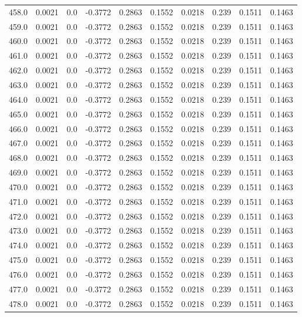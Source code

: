 \begin{longtable}{lrrrrrrrrr}
458.0 & 0.0021 & 0.0 & -0.3772 & 0.2863 & 0.1552 & 0.0218 & 0.239 & 0.1511 & 0.1463 \\
459.0 & 0.0021 & 0.0 & -0.3772 & 0.2863 & 0.1552 & 0.0218 & 0.239 & 0.1511 & 0.1463 \\
460.0 & 0.0021 & 0.0 & -0.3772 & 0.2863 & 0.1552 & 0.0218 & 0.239 & 0.1511 & 0.1463 \\
461.0 & 0.0021 & 0.0 & -0.3772 & 0.2863 & 0.1552 & 0.0218 & 0.239 & 0.1511 & 0.1463 \\
462.0 & 0.0021 & 0.0 & -0.3772 & 0.2863 & 0.1552 & 0.0218 & 0.239 & 0.1511 & 0.1463 \\
463.0 & 0.0021 & 0.0 & -0.3772 & 0.2863 & 0.1552 & 0.0218 & 0.239 & 0.1511 & 0.1463 \\
464.0 & 0.0021 & 0.0 & -0.3772 & 0.2863 & 0.1552 & 0.0218 & 0.239 & 0.1511 & 0.1463 \\
465.0 & 0.0021 & 0.0 & -0.3772 & 0.2863 & 0.1552 & 0.0218 & 0.239 & 0.1511 & 0.1463 \\
466.0 & 0.0021 & 0.0 & -0.3772 & 0.2863 & 0.1552 & 0.0218 & 0.239 & 0.1511 & 0.1463 \\
467.0 & 0.0021 & 0.0 & -0.3772 & 0.2863 & 0.1552 & 0.0218 & 0.239 & 0.1511 & 0.1463 \\
468.0 & 0.0021 & 0.0 & -0.3772 & 0.2863 & 0.1552 & 0.0218 & 0.239 & 0.1511 & 0.1463 \\
469.0 & 0.0021 & 0.0 & -0.3772 & 0.2863 & 0.1552 & 0.0218 & 0.239 & 0.1511 & 0.1463 \\
470.0 & 0.0021 & 0.0 & -0.3772 & 0.2863 & 0.1552 & 0.0218 & 0.239 & 0.1511 & 0.1463 \\
471.0 & 0.0021 & 0.0 & -0.3772 & 0.2863 & 0.1552 & 0.0218 & 0.239 & 0.1511 & 0.1463 \\
472.0 & 0.0021 & 0.0 & -0.3772 & 0.2863 & 0.1552 & 0.0218 & 0.239 & 0.1511 & 0.1463 \\
473.0 & 0.0021 & 0.0 & -0.3772 & 0.2863 & 0.1552 & 0.0218 & 0.239 & 0.1511 & 0.1463 \\
474.0 & 0.0021 & 0.0 & -0.3772 & 0.2863 & 0.1552 & 0.0218 & 0.239 & 0.1511 & 0.1463 \\
475.0 & 0.0021 & 0.0 & -0.3772 & 0.2863 & 0.1552 & 0.0218 & 0.239 & 0.1511 & 0.1463 \\
476.0 & 0.0021 & 0.0 & -0.3772 & 0.2863 & 0.1552 & 0.0218 & 0.239 & 0.1511 & 0.1463 \\
477.0 & 0.0021 & 0.0 & -0.3772 & 0.2863 & 0.1552 & 0.0218 & 0.239 & 0.1511 & 0.1463 \\
478.0 & 0.0021 & 0.0 & -0.3772 & 0.2863 & 0.1552 & 0.0218 & 0.239 & 0.1511 & 0.1463 \\

\end{longtable}
